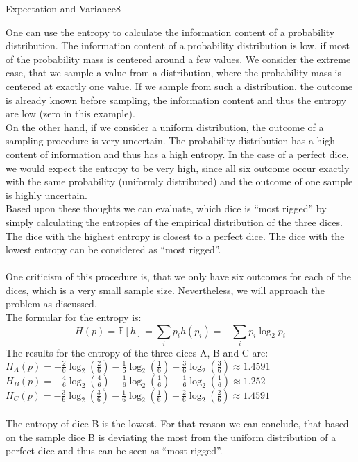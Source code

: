 \begin{questions}
\begin{question}{Expectation and Variance}{8}
\begin{answer}
One can use the entropy to calculate the information content of a probability distribution. The information content of a probability distribution is low, if most of the probability mass is centered around a few values. We consider the extreme case, that we sample a value from a distribution, where the probability mass is centered at exactly one value. If we sample from such a distribution, the outcome is already known before sampling, the information content and thus the entropy are low (zero in this example).\\ On the other hand, if we consider a uniform distribution, the outcome of a sampling procedure is very uncertain. The probability distribution has a high content of information and thus has a high entropy. In the case of a perfect dice, we would expect the entropy to be very high, since all six outcome occur exactly with the same probability (uniformly distributed) and the outcome of one sample is highly uncertain. \\
Based upon these thoughts we can evaluate, which dice is ``most rigged'' by simply calculating the entropies of the empirical distribution of the three dices. The dice with the highest entropy is closest to a perfect dice. The dice with the lowest entropy can be considered as ``most rigged''. \\ \\
One criticism of this procedure is, that we only have six outcomes for each of the dices, which is a very small sample size. Nevertheless, we will approach the problem as discussed.\\
The formular for the entropy is:
\begin{equation}
H(p)=\mathbb{E}[h]=\sum_{i} p_{i} h(p_{i})=-\sum_{i} p_{i} \log _{2} p_{i}
\end{equation}
The results for the entropy of the three dices A, B and C are:\\
$H_{A}(p)=-\frac{2}{6}\log_2(\frac{2}{6})-\frac{1}{6}\log_2(\frac{1}{6})-\frac{3}{6}\log_2(\frac{3}{6}) \approx 1.4591$\\
$H_{B}(p)=-\frac{4}{6}\log_2(\frac{4}{6})-\frac{1}{6}\log_2(\frac{1}{6})-\frac{1}{6}\log_2(\frac{1}{6}) \approx 1.252$\\
$H_{C}(p)=-\frac{3}{6}\log_2(\frac{3}{6})-\frac{1}{6}\log_2(\frac{1}{6})-\frac{2}{6}\log_2(\frac{2}{6}) \approx 1.4591$\\ \\
The entropy of dice B is the lowest. For that reason we can conclude, that based on the sample dice B is deviating the most from the uniform distribution of a perfect dice and thus can be seen as ``most rigged''.
\end{answer}
\end{question}


\end{questions}
